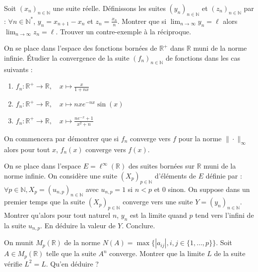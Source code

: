 \begin{exercice}
Soit $(x_{n})_{n\in\mathbb{N}}$ une suite réelle. Définissons les suites $(y_{n})_{n\in\mathbb{N}}$ et $(z_{n})_{n\in\mathbb{N}}$ par :
$\forall n\in\mathbb{N}^{*}$, $y_{n}=x_{n+1}-x_{n}$ et $z_{n}=\frac{x_{n}}{n}$.
Montrer que si $\lim_{n\rightarrow\infty}y_{n}=\ell$ alors $\lim_{n\rightarrow\infty}z_{n}=\ell$.
Trouver un contre-exemple à la réciproque.
\end{exercice}

\begin{exercice}
On se place dans l'espace des fonctions bornées de $\mathbb{R}^{+}$ dans $\mathbb{R}$ muni de la norme infinie.
Étudier la convergence de la suite $(f_{n})_{n\in\mathbb{N}}$ de fonctions dans les cas suivants :
\begin{enumerate}
    \item $f_{n}:\mathbb{R}^{+}\rightarrow\mathbb{R}, \quad x\mapsto\frac{x}{1+nx}$
    \item $f_{n}:\mathbb{R}^{+}\rightarrow\mathbb{R}, \quad x\mapsto nxe^{-nx}\sin(x)$
    \item $f_{n}:\mathbb{R}^{+}\rightarrow\mathbb{R}, \quad x\mapsto\frac{ne^{-x}+1}{x^{2}+n}$
\end{enumerate}
On commencera par démontrer que si $f_{n}$ converge vers $f$ pour la norme $\|\cdot\|_{\infty}$ alors pour tout $x$, $f_{n}(x)$ converge vers $f(x)$.
\end{exercice}

\begin{exercice}
On se place dans l'espace $E=\ell^{\infty}(\mathbb{R})$ des suites bornées sur $\mathbb{R}$ muni de la norme infinie.
On considère une suite $(X_{p})_{p\in\mathbb{N}}$ d'éléments de $E$ définie par : $\forall p\in\mathbb{N}, X_{p}=(u_{n,p})_{n\in\mathbb{N}}$ avec $u_{n,p}=1$ si $n<p$ et $0$ sinon.
On suppose dans un premier temps que la suite $(X_{p})_{p\in\mathbb{N}}$ converge vers une suite $Y=(y_{n})_{n\in\mathbb{N}}$.
Montrer qu'alors pour tout naturel $n$, $y_{n}$ est la limite quand $p$ tend vers l'infini de la suite $u_{n,p}$.
En déduire la valeur de $Y$. Conclure.
\end{exercice}

\begin{exercice}
On munit $M_{p}(\mathbb{R})$ de la norme $N(A) = \max\{|a_{ij}|, i,j\in\{1,\dots,p\}\}$.
Soit $A\in M_{p}(\mathbb{R})$ telle que la suite $A^{n}$ converge.
Montrer que la limite $L$ de la suite vérifie $L^{2}=L$. Qu'en déduire ?
\end{exercice}

